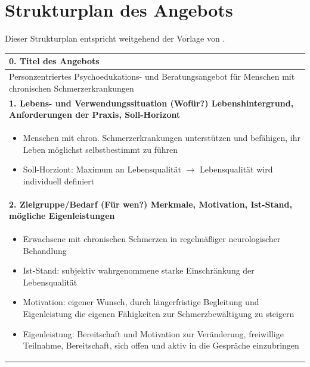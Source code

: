 \documentclass[
  twoside,
  parskip=half-,
]{scrreprt}
\begin{document}
\section{Strukturplan des Angebots}\label{strukturplan}
Dieser Strukturplan entspricht weitgehend der Vorlage von \citeauthor[91]{schlutz}.
\begin{center}
  \def\arraystretch{1.5}
  \begin{longtable}{p{}}
    \hline
    \bfseries 0. Titel des Angebots \\\hline
    Personzentriertes Psychoedukations- und Beratungsangebot für Menschen mit chronischen   Schmerzerkrankungen \\\hline
    \bfseries 1. Lebens- und Verwendungssituation (Wofür?) \newline
    Lebenshintergrund, Anforderungen der Praxis, Soll-Horizont \\\hline
    \begin{itemize}[nosep, topsep=-10pt]
    \item	Menschen mit chron. Schmerzerkrankungen unterstützen und befähigen, ihr Leben möglichst selbstbestimmt zu führen
    \item Soll-Horziont: Maximum an Lebensqualität $\rightarrow$ Lebensqualität wird individuell definiert
    \end{itemize} \\\hline
    \bfseries 2. Zielgruppe/Bedarf (Für wen?)\newline
    Merkmale, Motivation, Ist-Stand, mögliche Eigenleistungen \\\hline
    \begin{itemize}[nosep, topsep=-10pt]
    \item	Erwachsene mit chronischen Schmerzen in regelmäßiger neurologischer Behandlung 
    \item	Ist-Stand: subjektiv wahrgenommene starke Einschränkung der Lebensqualität
    \item	Motivation: eigener Wunsch, durch längerfristige Begleitung und Eigenleistung die eigenen Fähigkeiten zur Schmerzbewältigung zu steigern
    \item	Eigenleistung: Bereitschaft und Motivation zur Veränderung, freiwillige Teilnahme, Bereitschaft, sich offen und aktiv in die Gespräche einzubringen
    \end{itemize} \\\hline
    

\end{longtable}
\end{center}
\end{document}
